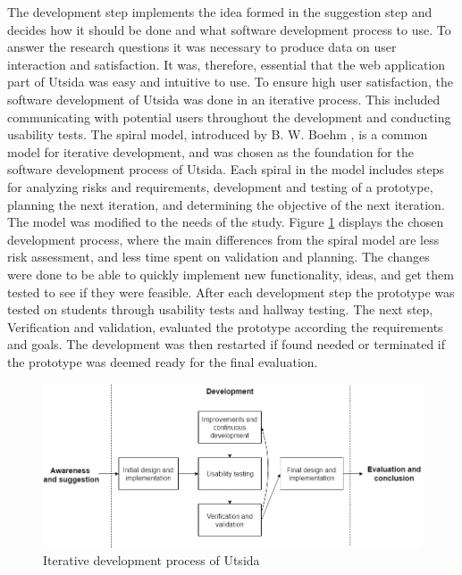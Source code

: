 The development step implements the idea formed in the suggestion step and decides how it should be done and what software development process to use. To answer the research questions it was necessary to produce data on user interaction and satisfaction. It was, therefore, essential that the web application part of Utsida was easy and intuitive to use. To ensure high user satisfaction, the software development of Utsida was done in an iterative process. This included communicating with potential users throughout the development and conducting usability tests. The spiral model, introduced by B. W. Boehm \cite{boehm1988spiral}, is a common model for iterative development, and was chosen as the foundation for the software development process of Utsida. Each spiral in the model includes steps for analyzing risks and requirements, development and testing of a prototype, planning the next iteration, and determining the objective of the next iteration. The model was modified to the needs of the study. Figure \ref{fig:development_process} displays the chosen development process, where the main differences from the spiral model are less risk assessment, and less time spent on validation and planning. The changes were done to be able to quickly implement new functionality, ideas, and get them tested to see if they were feasible. After each development step the prototype was tested on students through usability tests and hallway testing. The next step, Verification and validation, evaluated the prototype according the requirements and goals. The development was then restarted if found needed or terminated if the prototype was deemed ready for the final evaluation.

\begin{figure}[h]
    \centering
    \includegraphics[width=1\textwidth]{fig/research_process_2.png}
    \caption[Development process]{Iterative development process of Utsida}
    \label{fig:development_process}
\end{figure}

